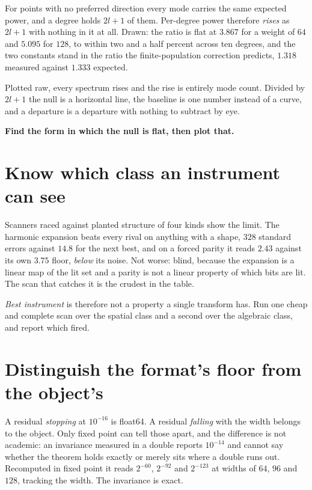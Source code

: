 For points with no preferred direction every mode carries the same expected power, and a degree holds \(2l+1\) of them. Per-degree power therefore \emph{rises} as \(2l+1\) with nothing in it at all. Drawn: the ratio is flat at \(3.867\) for a weight of \(64\) and \(5.095\) for \(128\), to within two and a half percent across ten degrees, and the two constants stand in the ratio the finite-population correction predicts, \(1.318\) measured against \(1.333\) expected.

Plotted raw, every spectrum rises and the rise is entirely mode count. Divided by \(2l+1\) the null is a horizontal line, the baseline is one number instead of a curve, and a departure is a departure with nothing to subtract by eye.

\textbf{Find the form in which the null is flat, then plot that.}

\section{Know which class an instrument can see}

Scanners raced against planted structure of four kinds show the limit. The harmonic expansion beats every rival on anything with a shape, \(328\) standard errors against \(14.8\) for the next best, and on a forced parity it reads \(2.43\) against its own \(3.75\) floor, \emph{below} its noise. Not worse: blind, because the expansion is a linear map of the lit set and a parity is not a linear property of which bits are lit. The scan that catches it is the crudest in the table.

\emph{Best instrument} is therefore not a property a single transform has. Run one cheap and complete scan over the spatial class and a second over the algebraic class, and report which fired.

\section{Distinguish the format's floor from the object's}

A residual \emph{stopping} at \(10^{-16}\) is float64. A residual \emph{falling} with the width belongs to the object. Only fixed point can tell those apart, and the difference is not academic: an invariance measured in a double reports \(10^{-14}\) and cannot say whether the theorem holds exactly or merely sits where a double runs out. Recomputed in fixed point it reads \(2^{-60}\), \(2^{-92}\) and \(2^{-123}\) at widths of \(64\), \(96\) and \(128\), tracking the width. The invariance is exact.

